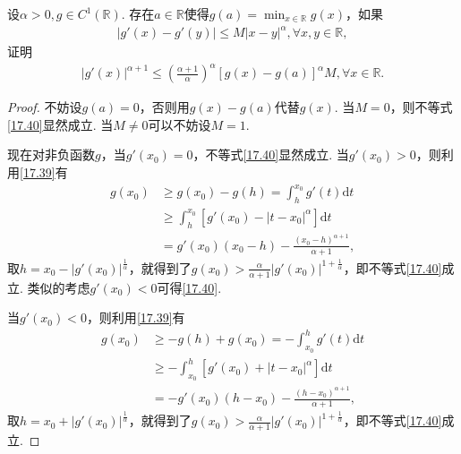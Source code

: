 \documentclass[../../main.tex]{subfiles}
\begin{document}
\begin{proposition}\label{proposition:g'(x)的Hölder连续相关结论}
设$\alpha>0, g\in C^1(\mathbb{R})$. 存在$a\in\mathbb{R}$使得$g(a)=\min_{x\in\mathbb{R}}g(x)$，如果
\begin{align}
|g'(x) - g'(y)| \leqslant M|x - y|^{\alpha}, \forall x,y\in\mathbb{R}, \label{17.39}
\end{align}
证明
\begin{align}
|g'(x)|^{\alpha + 1} \leqslant \left(\frac{\alpha + 1}{\alpha}\right)^{\alpha}[g(x) - g(a)]^{\alpha}M, \forall x\in\mathbb{R}. \label{17.40}
\end{align}
\end{proposition}
\begin{proof}
不妨设$g(a)=0$，否则用$g(x) - g(a)$代替$g(x)$. 当$M = 0$，则不等式\eqref{17.40}显然成立. 当$M\neq0$可以不妨设$M = 1$.

现在对非负函数$g$，当$g'(x_0)=0$，不等式\eqref{17.40}显然成立. 当$g'(x_0)>0$，则利用\eqref{17.39}有
\begin{align*}
g(x_0) &\geqslant g(x_0) - g(h)=\int_{h}^{x_0}g'(t)\mathrm{d}t \\
&\geqslant \int_{h}^{x_0}[g'(x_0) - |t - x_0|^{\alpha}]\mathrm{d}t \\
&= g'(x_0)(x_0 - h)-\frac{(x_0 - h)^{\alpha + 1}}{\alpha + 1},
\end{align*}
取$h = x_0 - |g'(x_0)|^{\frac{1}{\alpha}}$，就得到了$g(x_0)>\frac{\alpha}{\alpha + 1}|g'(x_0)|^{1 + \frac{1}{\alpha}}$，即不等式\eqref{17.40}成立. 类似的考虑$g'(x_0)<0$可得\eqref{17.40}.

当$g'(x_0)<0$，则利用\eqref{17.39}有
\begin{align*}
g(x_0) &\geqslant -g(h) + g(x_0)=-\int_{x_0}^{h}g'(t)\mathrm{d}t \\
&\geqslant -\int_{x_0}^{h}[g'(x_0) + |t - x_0|^{\alpha}]\mathrm{d}t \\
&= -g'(x_0)(h - x_0)-\frac{(h - x_0)^{\alpha + 1}}{\alpha + 1},
\end{align*}
取$h = x_0 + |g'(x_0)|^{\frac{1}{\alpha}}$，就得到了$g(x_0)>\frac{\alpha}{\alpha + 1}|g'(x_0)|^{1 + \frac{1}{\alpha}}$，即不等式\eqref{17.40}成立. 

\end{proof}
\end{document}
